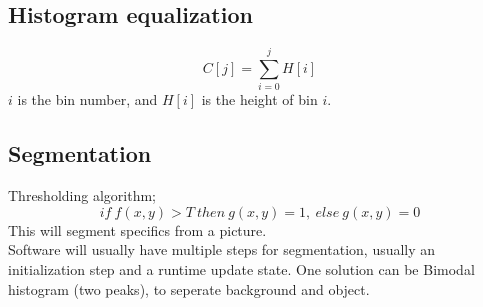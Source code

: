 \documentclass{article}
\begin{document}
\subsection{Histogram equalization}
$$C[j] = \sum_{i=0}^j{H[i]}$$
$i$ is the bin number, and $H[i]$ is the height of bin $i$.

\subsection{Segmentation}
Thresholding algorithm;
$$if \ f(x, y) > T \ then \ g(x, y) = 1, \ else \ g(x, y) = 0$$
This will segment specifics from a picture.\\
Software will usually have multiple steps for segmentation, usually an initialization step and a runtime update state. One solution can be Bimodal histogram (two peaks), to seperate background and object.\\
\end{document}
